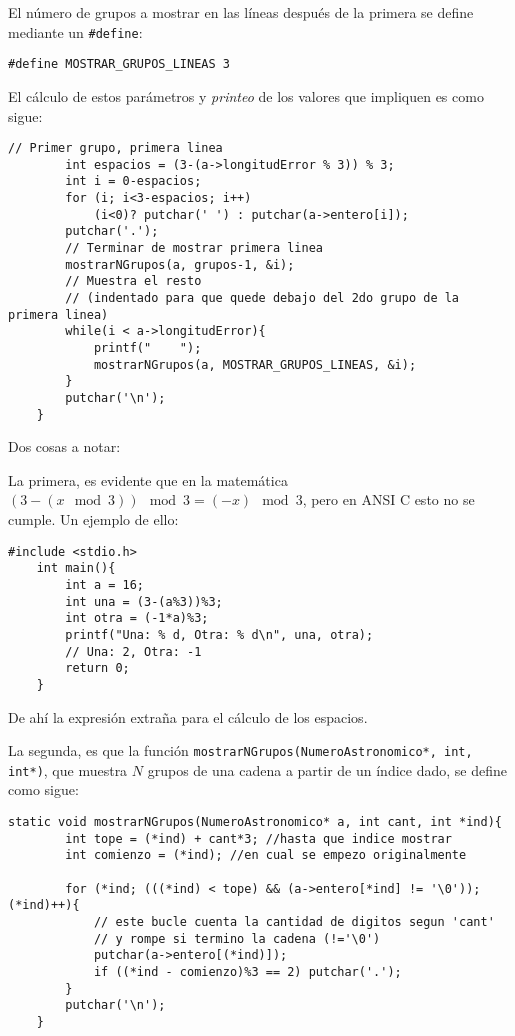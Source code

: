 \documentclass[a4paper, 12pt]{article}
\begin{document}
El número de grupos a mostrar en las líneas después de la primera se define mediante un \verb|#define|:

\begin{lstlisting}[style=C]
    #define MOSTRAR_GRUPOS_LINEAS 3
\end{lstlisting}

El cálculo de estos parámetros y \emph{printeo} de los valores que impliquen es como sigue:

\begin{lstlisting}[style=C]
        // Primer grupo, primera linea
        int espacios = (3-(a->longitudError % 3)) % 3;
        int i = 0-espacios;
        for (i; i<3-espacios; i++) 
            (i<0)? putchar(' ') : putchar(a->entero[i]);
        putchar('.');
        // Terminar de mostrar primera linea
        mostrarNGrupos(a, grupos-1, &i);
        // Muestra el resto
        // (indentado para que quede debajo del 2do grupo de la primera linea)
        while(i < a->longitudError){
            printf("    ");
            mostrarNGrupos(a, MOSTRAR_GRUPOS_LINEAS, &i);
        }
        putchar('\n');
    }
\end{lstlisting}

Dos cosas a notar:

La primera, es evidente que en la matemática $(3-(x\mod3))\mod3 = (-x)\mod3$, pero en ANSI C esto no se cumple. Un ejemplo de ello:

\begin{lstlisting}[style=C]
    #include <stdio.h>
    int main(){
        int a = 16;
        int una = (3-(a%3))%3;
        int otra = (-1*a)%3;
        printf("Una: % d, Otra: % d\n", una, otra);
        // Una: 2, Otra: -1
        return 0;
    }
\end{lstlisting}

De ahí la expresión extraña para el cálculo de los espacios.

La segunda, es que la función \texttt{mostrarNGrupos(NumeroAstronomico*, int, int*)}, que muestra $N$ grupos de una cadena a partir de un índice dado, se define como sigue:

\begin{lstlisting}[style=C]
    static void mostrarNGrupos(NumeroAstronomico* a, int cant, int *ind){
        int tope = (*ind) + cant*3; //hasta que indice mostrar
        int comienzo = (*ind); //en cual se empezo originalmente
    
        for (*ind; (((*ind) < tope) && (a->entero[*ind] != '\0')); (*ind)++){
            // este bucle cuenta la cantidad de digitos segun 'cant'
            // y rompe si termino la cadena (!='\0')
            putchar(a->entero[(*ind)]);
            if ((*ind - comienzo)%3 == 2) putchar('.');
        }
        putchar('\n');
    }
\end{lstlisting}
\end{document}
